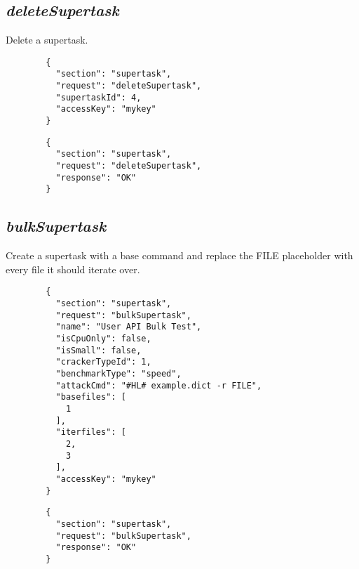 \subsection*{\textit{deleteSupertask}}
	Delete a supertask.
	{
		\color{blue}
		\begin{verbatim}
		{
		  "section": "supertask",
		  "request": "deleteSupertask",
		  "supertaskId": 4,
		  "accessKey": "mykey"
		}
		\end{verbatim}
	}
	{
		\color{OliveGreen}
		\begin{verbatim}
		{
		  "section": "supertask",
		  "request": "deleteSupertask",
		  "response": "OK"
		}
		\end{verbatim}
	}
\subsection*{\textit{bulkSupertask}}
	Create a supertask with a base command and replace the FILE placeholder with every file it should iterate over.
	{
		\color{blue}
		\begin{verbatim}
		{
		  "section": "supertask",
		  "request": "bulkSupertask",
		  "name": "User API Bulk Test",
		  "isCpuOnly": false,
		  "isSmall": false,
		  "crackerTypeId": 1,
		  "benchmarkType": "speed",
		  "attackCmd": "#HL# example.dict -r FILE",
		  "basefiles": [
		    1
		  ],
		  "iterfiles": [
		    2,
		    3
		  ],
		  "accessKey": "mykey"
		}
		\end{verbatim}
	}
	{
		\color{OliveGreen}
		\begin{verbatim}
		{
		  "section": "supertask",
		  "request": "bulkSupertask",
		  "response": "OK"
		}
		\end{verbatim}
	}





